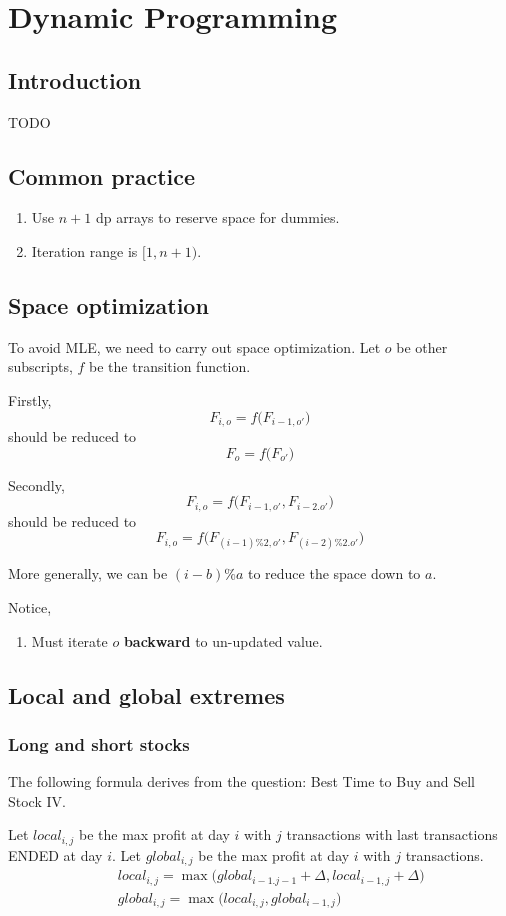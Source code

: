 \chapter{Dynamic Programming}
\section{Introduction}
TODO
\section{Common practice}
\begin{enumerate}
\item Use $n+1$ dp arrays to reserve space for dummies. 
\item Iteration range is $[1, n+1)$.
\end{enumerate}
\section{Space optimization}
To avoid MLE, we need to carry out space optimization. Let $o$ be other subscripts, $f$ be the transition function. 

Firstly,
$$
F_{i, o} = f\big(F_{i-1, o'}\big)
$$
should be reduced to 
$$
F_{o} = f\big(F_{o'}\big)
$$

Secondly,
$$
F_{i, o} = f\big(F_{i-1, o'}, F_{i-2. o'}\big)
$$
should be reduced to 
$$
F_{i, o} = f\big(F_{(i-1)\%2, o'}, F_{(i-2)\%2. o'}\big)
$$

More generally, we can be $(i-b)\%a$ to reduce the space down to $a$.

Notice,
\begin{enumerate}
\item Must iterate $o$ \textbf{backward} to un-updated value. 
\end{enumerate}
\section{Local and global extremes}
\subsection{Long and short stocks}
The following formula derives from the question: Best Time to Buy and Sell Stock IV. 

Let $local_{i, j}$ be the max profit at day $i$ with $j$ transactions with last transactions ENDED at day $i$. Let $global_{i, j}$ be the max profit at day $i$ with $j$ transactions.  
\begin{eqnarray}
&& local_{i,j} = \max\Big(global_{i-1.j-1}+\Delta, local_{i-1,j}+\Delta\Big) \nonumber \\
&& global_{i,j} = \max\Big(local_{i, j}, global_{i-1,j}\Big)
\end{eqnarray}

